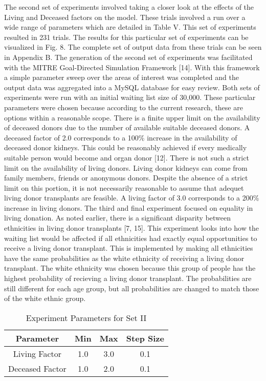 \documentclass[9pt,a4paper,twocolumn]{scrartcl}
\begin{document}
The second set of experiments involved taking a closer look at the effects of the Living and Deceased factors on the model.  These trials involved a run over a wide range of parameters which are detailed in Table V.  This set of experiments resulted in 231 trials.  The results for this particular set of experiments can be visualized in Fig. 8.  The complete set of output data from these trials can be seen in Appendix B.  The generation of the second set of experiments was facilitated with the MITRE Goal-Directed Simulation Framework [14].  With this framework a simple parameter sweep over the areas of interest was completed and the output data was aggregated into a MySQL database for easy review.  Both sets of experiments were run with an initial waiting list size of 30,000.
These particular parameters were chosen because according to the current research, these are options within a reasonable scope.  There is a finite upper limit on the availability of deceased donors due to the number of available suitable deceased donors.  A deceased factor of 2.0 corresponds to a 100\% increase in the availability of deceased donor kidneys.  This could be reasonably achieved if every medically suitable person  would become and organ donor [12].  There is not such a strict limit on the availability of living donors.  Living donor kidneys can come from family members, friends or anonymous donors.  Despite the absence of a strict limit on this portion, it is not necessarily reasonable to assume that adequet living donor transplants are feasible.  A living factor of 3.0 corresponds to a 200\% increase in living donors.
The third and final experiment focused on equality in living donation.  As noted earlier, there is a significant disparity between ethnicities in living donor transplants [7, 15].  This experiment looks into how the waiting list would be affected if all ethnicities had exactly equal opportunities to receive a living donor transplant.  This is implemented by making all ethnicities have the same probabilities as the white ethnicity of receiving a living donor transplant.  The white ethnicity was chosen because this group of people has the highest probability of recieving a living donor transplant.  The probabilities are still different for each age group, but all probabilities are changed to match those of the white ethnic group.

\begin{table}[ht] 
\caption{Experiment Parameters for Set II} %
\centering %
\begin{tabular}{c c c c} %
\hline\hline %
Parameter & Min & Max & Step Size\\ [0.5ex] %
\hline %
Living Factor & 1.0 & 3.0 & 0.1 \\ 
Deceased Factor & 1.0 & 2.0 & 0.1  \\ [1ex]
\hline %
\end{tabular} 
\label{table:experiment2} %
\end{table}
\end{document}
